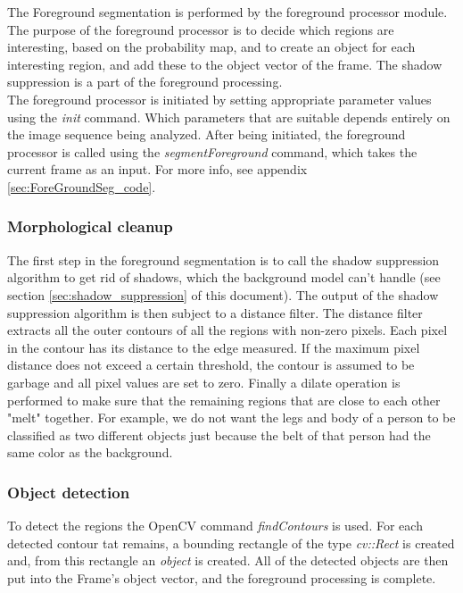The Foreground segmentation is performed by the foreground processor module. The purpose of the foreground processor is to decide which regions are interesting, based on the probability map, and to create an object for each interesting region, and add these to the object vector of the frame. The shadow suppression is a part of the foreground processing. \\
\newline
The foreground processor is initiated by setting appropriate parameter values using the \emph{init} command. Which parameters that are suitable depends entirely on the image sequence being analyzed. After being initiated, the foreground processor is called using the \emph{segmentForeground} command, which takes the current frame as an input. For more info, see appendix \ref{sec:ForeGroundSeg_code}.

\subsubsection{Morphological cleanup}
The first step in the foreground segmentation is to call the shadow suppression algorithm to get rid of shadows, which the background model can't handle (see section \ref{sec:shadow_suppression} of this document). The output of the shadow suppression algorithm is then subject to a distance filter. The distance filter extracts all the outer contours of all the regions with non-zero pixels. Each pixel in the contour has its distance to the edge measured. If the maximum pixel distance does not exceed a certain threshold, the contour is assumed to be garbage and all pixel values are set to zero. Finally a dilate operation is performed to make sure that the remaining regions that are close to each other "melt" together. For example, we do not want the legs and body of a person to be classified as two different objects just because the belt of that person had the same color as the background. 


\subsubsection{Object detection}
To detect the regions the OpenCV command \emph{findContours} is used. For each detected contour tat remains, a bounding rectangle of the type \emph{cv::Rect} is created and, from this rectangle an \emph{object} is created. All of the detected objects are then put into the Frame's object vector, and the foreground processing is complete.

